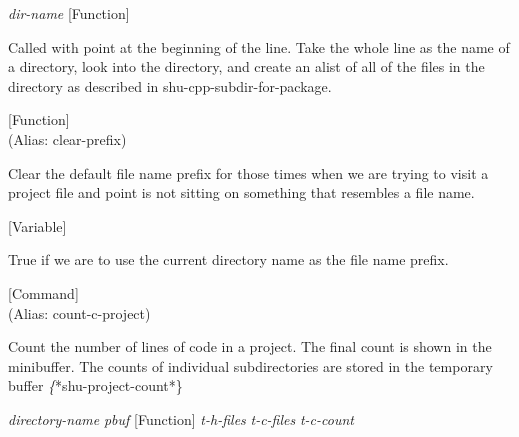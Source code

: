 \vspace{1em}
\noindent
{}
\usebox{\funcname}\emph{dir-name}
 \hfill [Function]

\begin{doc-string}
Called with point at the beginning of the line.  Take the whole line as the
name of a directory, look into the directory, and create an alist of all of the
files in the directory as described in shu-cpp-subdir-for-package.
\end{doc-string}

\vspace{1em}
\noindent
{}
\usebox{\funcname}
 \hfill [Function]\\%
 (Alias: clear-prefix)

\begin{doc-string}
Clear the default file name prefix for those times when we are trying to visit
a project file and point is not sitting on something that resembles a file name.
\end{doc-string}

\vspace{1em}
\noindent
{}
\usebox{\funcname}
 \hfill [Variable]

\begin{doc-string}
True if we are to use the current directory name as the file name prefix.
\end{doc-string}

\vspace{1em}
\noindent
{}
\usebox{\funcname}
 \hfill [Command]\\%
 (Alias: count-c-project)

\begin{doc-string}
Count the number of lines of code in a project.  The final count is shown in
the minibuffer.  The counts of individual subdirectories are stored in the
temporary buffer \emph\{*shu-project-count*\}
\end{doc-string}

\vspace{1em}
\noindent
{}
\usebox{\funcname}\emph{directory-name} \emph{pbuf}
 \hfill [Function]
\hspace*{\wd\funcname}\emph{t-h-files} \emph{t-c-files}
\hspace*{\wd\funcname}\emph{t-c-count}

